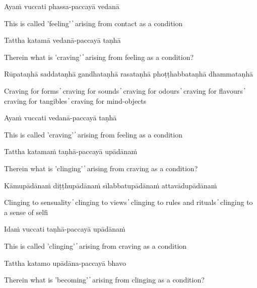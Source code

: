 Ayaṁ vuccati phassa-paccayā vedanā

\begin{cprenglish}
  This is called 'feeling'  ̓  arising from contact as a condition
\end{cprenglish}

Tattha katamā vedanā-paccayā taṇhā

\begin{cprenglish}
  Therein what is 'craving'  ̓  arising from feeling as a condition?
\end{cprenglish}

Rūpataṇhā saddataṇhā gandhataṇhā rasataṇhā phoṭṭhabbataṇhā dhammataṇhā

\begin{cprenglish}
  Craving for forms  ̓  craving for sounds  ̓  craving for odours  ̓  craving for flavours  ̓  craving for tangibles  ̓  craving for mind-objects
\end{cprenglish}

Ayaṁ vuccati vedanā-paccayā taṇhā

\begin{cprenglish}
  This is called 'craving'  ̓  arising from feeling as a condition
\end{cprenglish}

Tattha katamaṁ taṇhā-paccayā upādānaṁ

\begin{cprenglish}
  Therein what is 'clinging'  ̓  arising from craving as a condition?
\end{cprenglish}

Kāmupādānaṁ diṭṭhupādānaṁ sīlabbatupādānaṁ attavādupādānaṁ

\begin{cprenglish}
  Clinging to sensuality  ̓  clinging to views  ̓  clinging to rules and rituals  ̓  clinging to a sense of selfi
\end{cprenglish}

Idaṁ vuccati taṇhā-paccayā upādānaṁ

\begin{cprenglish}
  This is called 'clinging'  ̓  arising from craving as a condition
\end{cprenglish}

Tattha katamo upādāna-paccayā bhavo

\begin{cprenglish}
  Therein what is 'becoming'  ̓  arising from clinging as a condition?
\end{cprenglish}

